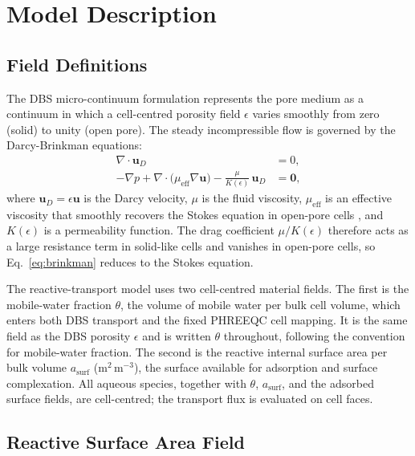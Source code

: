 \section{Model Description}
\label{sec:model}

\subsection{Field Definitions}

The DBS micro-continuum formulation \citep{brinkman1949calculation,soulaine2016micro,
soulaine2024microcontinuum} represents the pore medium as a continuum in which
a cell-centred porosity field $\epsilon$ varies smoothly from
zero (solid) to unity (open pore). The steady incompressible flow is governed
by the Darcy-Brinkman equations:
\begin{align}
\nabla \cdot \bm{u}_D &= 0,
\label{eq:continuity} \\
-\nabla p + \nabla \cdot \bigl(\mu_{\mathrm{eff}} \nabla \bm{u}\bigr)
- \frac{\mu}{K(\epsilon)}\,\bm{u}_D &= \bm{0},
\label{eq:brinkman}
\end{align}
where $\bm{u}_D = \epsilon\bm{u}$ is the Darcy velocity,
$\mu$ is the fluid viscosity, $\mu_{\mathrm{eff}}$ is an effective
viscosity that smoothly recovers the Stokes equation in open-pore cells
\citep{soulaine2016micro}, and $K(\epsilon)$ is a permeability
function. The drag coefficient $\mu/K(\epsilon)$ therefore acts
as a large resistance term in solid-like cells and vanishes in open-pore cells,
so Eq.~\eqref{eq:brinkman} reduces to the Stokes equation.

The reactive-transport model uses two cell-centred material fields. The first
is the mobile-water fraction $\theta$, the volume of mobile water per bulk cell
volume, which enters both DBS transport and the fixed PHREEQC cell mapping. It
is the same field as the DBS porosity $\epsilon$ and is written $\theta$
throughout, following the convention for mobile-water fraction. The second is
the reactive internal surface area per bulk volume $a_{\mathrm{surf}}$
(m$^2$\,m$^{-3}$), the surface available for adsorption and surface
complexation. All aqueous species, together with $\theta$,
$a_{\mathrm{surf}}$, and the adsorbed surface fields, are cell-centred; the
transport flux is evaluated on cell faces.

\subsection{Reactive Surface Area Field}
\label{sec:aSurf}

